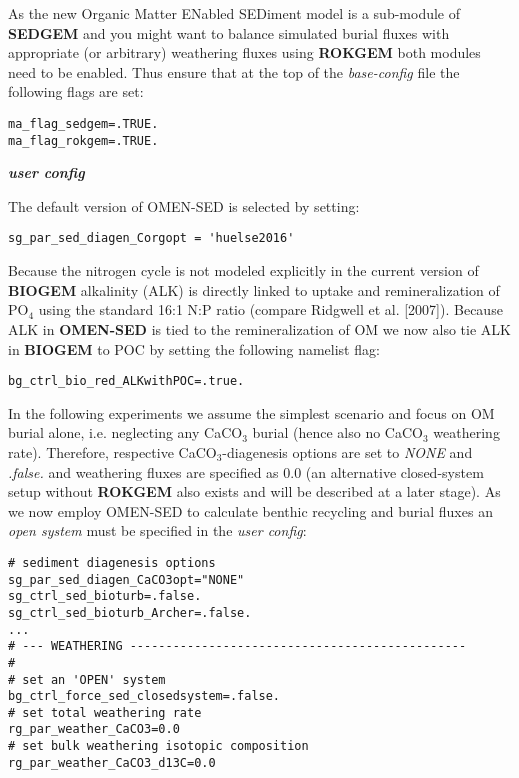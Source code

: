 \documentclass[11pt,fleqn]{book} %
\begin{document}
\noindent As the new Organic Matter ENabled SEDiment model is a sub-module of \textbf{SEDGEM} and you might want to balance simulated burial fluxes with appropriate (or arbitrary) weathering fluxes using \textbf{ROKGEM} both modules need to be enabled.
Thus ensure that at the top of the \textit{base-config} file the following flags are set:
\vspace{-1mm}\small\begin{verbatim}
ma_flag_sedgem=.TRUE.
ma_flag_rokgem=.TRUE.
\end{verbatim}\normalsize\vspace{-1mm}

\noindent \textbf{\textit{user config}}
\vspace{1mm}

\noindent The default version of OMEN-SED is selected by setting:
\vspace{-1mm}\begin{verbatim}
sg_par_sed_diagen_Corgopt = 'huelse2016'
\end{verbatim}\vspace{-1mm}
Because the nitrogen cycle is not modeled explicitly in the current version of \textbf{BIOGEM} alkalinity (ALK) is directly linked to uptake and remineralization of PO$_4$ using the standard 16:1 N:P ratio (compare Ridgwell et al. [2007]).
Because ALK in \textbf{OMEN-SED} is tied to the remineralization of OM we now also tie ALK in \textbf{BIOGEM} to POC by setting the following namelist flag:
\vspace{-1mm}\begin{verbatim}
bg_ctrl_bio_red_ALKwithPOC=.true.
\end{verbatim}\vspace{-1mm}
In the following experiments we assume the simplest scenario and focus on OM burial alone, i.e. neglecting any CaCO$_3$ burial (hence also no CaCO$_3$ weathering rate). Therefore, respective CaCO$_3$-diagenesis options are set to \textit{NONE} and \textit{.false.} and weathering fluxes are specified as 0.0 (an alternative closed-system setup without \textbf{ROKGEM} also exists and will be described at a later stage).
As we now employ OMEN-SED to calculate benthic recycling and burial fluxes an \textit{open system} must be specified in the \textit{user config}:
\vspace{-1mm}\begin{verbatim}
# sediment diagenesis options
sg_par_sed_diagen_CaCO3opt="NONE"
sg_ctrl_sed_bioturb=.false.
sg_ctrl_sed_bioturb_Archer=.false.
...
# --- WEATHERING -----------------------------------------------
#
# set an 'OPEN' system
bg_ctrl_force_sed_closedsystem=.false.
# set total weathering rate
rg_par_weather_CaCO3=0.0
# set bulk weathering isotopic composition
rg_par_weather_CaCO3_d13C=0.0
\end{verbatim}\vspace{-1mm}
\end{document}
